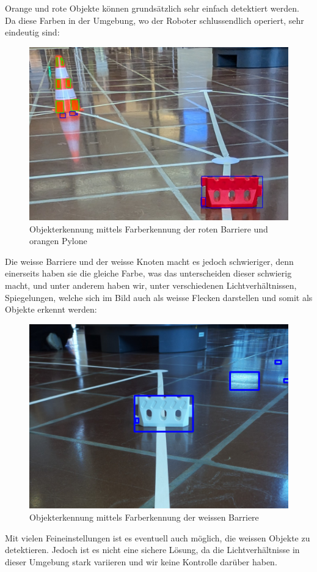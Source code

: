 Orange und rote Objekte können grundsätzlich sehr einfach detektiert werden. Da diese Farben in der Umgebung, wo der Roboter schlussendlich operiert, sehr eindeutig sind:

\begin{figure}[H]
    \centering
    \includegraphics[width=0.5\linewidth]{assets/informatik-prototyp/opencv/object_detection_with_hsv/hsv_object_detection.png}
    \caption{Objekterkennung mittels Farberkennung der roten Barriere und orangen Pylone}
    \label{fig:opencv_hsv_object_detection_good}
\end{figure}


Die weisse Barriere und der weisse Knoten macht es jedoch schwieriger, denn einerseits haben sie die gleiche Farbe, was das unterscheiden dieser schwierig macht, und unter anderem haben wir, unter verschiedenen Lichtverhältnissen, Spiegelungen, welche sich im Bild auch als weisse Flecken darstellen und somit als Objekte erkennt werden:

\begin{figure}[H]
    \centering
    \includegraphics[width=0.5\linewidth]{assets/informatik-prototyp/opencv/object_detection_with_hsv/hsv_object_detection_white.png}
    \caption{Objekterkennung mittels Farberkennung der weissen Barriere}
    \label{fig:opencv_hsv_object_detection_bad}
\end{figure}

Mit vielen Feineinstellungen ist es eventuell auch möglich, die weissen Objekte zu detektieren. Jedoch ist es nicht eine sichere Lösung, da die Lichtverhältnisse in dieser Umgebung stark variieren und wir keine Kontrolle darüber haben.


